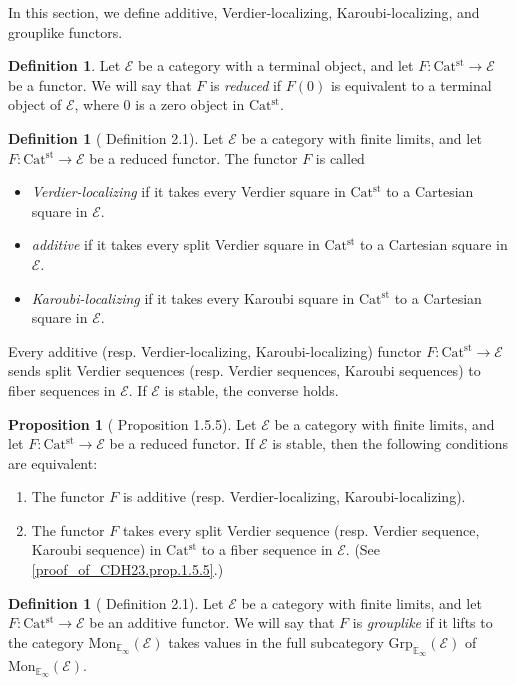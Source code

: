 \documentclass[a4paper,dvipdfmx,11pt,reqno]{amsart}
\newcommand{\E}{\mathcal{E}}
\newcommand{\Catst}{\mathrm{Cat^{st}}}
\newcommand{\Mon}{\mathrm{Mon}_{\mathbb{E}_{\infty}}}
\newcommand{\Grp}{\mathrm{Grp}_{\mathbb{E}_{\infty}}}
\theoremstyle{definition}
\newtheorem{definition}[theorem]{Definition}
\newtheorem{proposition}[theorem]{Proposition}
\begin{document}
In this section, we define additive, Verdier-localizing, Karoubi-localizing, and grouplike functors. 

\begin{definition}
  Let $\E$ be a category with a terminal object, and let $F : \Catst \to \E$ be a functor.
  We will say that $F$ is \textit{reduced} if $F(0)$ is equivalent to a terminal object of $\E$, where $0$ is a zero object in $\Catst$.
\end{definition}

\begin{definition}[\cite{HLS23} Definition 2.1] \label{HLS23.def.2.1} %
  Let $\E$ be a category with finite limits, and let $F : \Catst \to \E$ be a reduced functor.
  The functor $F$ is called 
  \begin{itemize}
    \item \textit{Verdier-localizing} if it takes every Verdier square in $\Catst$ to a Cartesian square in $\E$.
    \item \textit{additive} if it takes every split Verdier square in $\Catst$ to a Cartesian square in $\E$.
    \item \textit{Karoubi-localizing} if it takes every Karoubi square in $\Catst$ to a Cartesian square in $\E$.
  \end{itemize}
\end{definition}

Every additive (resp. Verdier-localizing, Karoubi-localizing) functor $F : \Catst \to \E$ sends split Verdier sequences (resp. Verdier sequences, Karoubi sequences) to fiber sequences in $\E$.
If $\E$ is stable, the converse holds.

\begin{proposition}[\cite{CDH23} Proposition 1.5.5] \label{CDH23.prop.1.5.5}
  Let $\E$ be a category with finite limits, and let $F : \Catst \to \E$ be a reduced functor.
  If $\E$ is stable, then the following conditions are equivalent:
  \begin{enumerate}
    \item The functor $F$ is additive (resp. Verdier-localizing, Karoubi-localizing).
    \item The functor $F$ takes every split Verdier sequence (resp. Verdier sequence, Karoubi sequence) in $\Catst$ to a fiber sequence in $\E$.
    (See \cref{proof_of_CDH23.prop.1.5.5}.)
  \end{enumerate}
\end{proposition}

\begin{definition}[\cite{HLS23} Definition 2.1] %
  Let $\E$ be a category with finite limits, and let $F : \Catst \to \E$ be an additive functor.
  We will say that $F$ is \textit{grouplike} if it lifts to the category $\Mon(\E)$ takes values in the full subcategory $\Grp(\E)$ of $\Mon(\E)$.
\end{definition}
\end{document}
